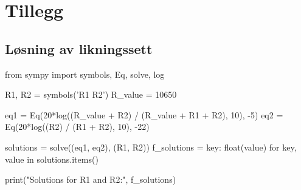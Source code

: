 \appendix

\section{Tillegg}
\label{ekstraGreier}

\subsection{Løsning av likningssett}
\begin{pythoncode}
from sympy import symbols, Eq, solve, log

R1, R2 = symbols('R1 R2')
R_value = 10650

eq1 = Eq(20*log((R_value + R2) / (R_value + R1 + R2), 10), -5)
eq2 = Eq(20*log((R2) / (R1 + R2), 10), -22)

solutions = solve((eq1, eq2), (R1, R2))
f_solutions = {key: float(value) for key, value in solutions.items()}

print("Solutions for R1 and R2:", f_solutions)
\end{pythoncode}

